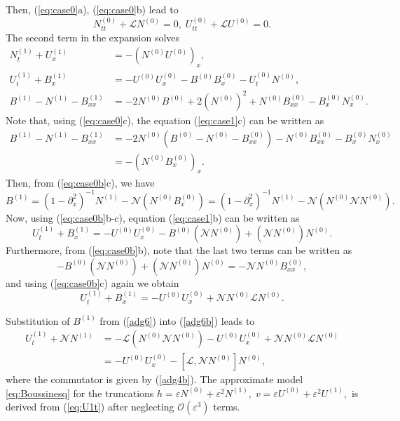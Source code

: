 \documentclass[final,11pt,a4paper,reqno]{amsart}
\theoremstyle{definition}
\begin{document}
Then, (\ref{eq:case0}a), (\ref{eq:case0}b) lead to
\begin{equation}\label{adg5}
N^{(0)}_{tt}+\mathscr{L}N^{(0)}=0,\;
U^{(0)}_{tt}+\mathscr{L}U^{(0)}=0.
\end{equation}
The second term in the expansion solves
\begin{subequations}\label{eq:case1}
\begin{align}
N^{(1)}_t+U^{(1)}_x&=-(N^{(0)}U^{(0)})_x,\\
U^{(1)}_t+B^{(1)}_x&=-U^{(0)}U^{(0)}_x-B^{(0)}B^{(0)}_x-U^{(0)}_tN^{(0)},\\
B^{(1)}-N^{(1)}-B^{(1)}_{xx}&=-2N^{(0)}B^{(0)}+2(N^{(0)})^2+N^{(0)}B_{xx}^{(0)}-B_x^{(0)}N_x^{(0)}.
\end{align}
\end{subequations}
Note that, using (\ref{eq:case0}c), the equation (\ref{eq:case1}c) can be written as
\begin{align*}
B^{(1)}-N^{(1)}-B^{(1)}_{xx}&=-2N^{(0)}(B^{(0)}-N^{(0)}-B_{xx}^{(0)})-N^{(0)}B_{xx}^{(0)}-B_x^{(0)}N_x^{(0)}\\
&=-(N^{(0)}B_{x}^{(0)})_x.
\end{align*}
Then, from (\ref{eq:case0b}c), we have
\begin{equation}\label{adg6}
B^{(1)}=(1-\partial_x^2)^{-1}N^{(1)}-\mathscr{N}(N^{(0)}B_{x}^{(0)})=(1-\partial_x^2)^{-1}N^{(1)}-\mathscr{N}(N^{(0)}\mathscr{N}N^{(0)}).
\end{equation}
Now, using (\ref{eq:case0b}b-c), equation (\ref{eq:case1}b) can be written as
\[
U^{(1)}_t+B^{(1)}_x=-U^{(0)}U^{(0)}_x-B^{(0)}(\mathscr{N}N^{(0)})+(\mathscr{N}N^{(0)})N^{(0)}.
\]
Furthermore, from (\ref{eq:case0b}b), note that the last two terms can be written as
\[-B^{(0)}(\mathscr{N}N^{(0)})+(\mathscr{N}N^{(0)})N^{(0)}=-\mathscr{N}N^{(0)}B^{(0)}_{xx},  \]
and using (\ref{eq:case0b}c) again we obtain
\begin{equation}\label{adg6b}
U^{(1)}_t+B^{(1)}_x=-U^{(0)}U^{(0)}_x+\mathscr{N}N^{(0)}\mathscr{L}N^{(0)}.
\end{equation}

Substitution of $B^{(1)}$ from (\ref{adg6}) into (\ref{adg6b}) leads to
\begin{align}
U^{(1)}_t+\mathscr{N}N^{(1)}&=-\mathscr{L}(N^{(0)}\mathscr{N}N^{(0)})-U^{(0)}U^{(0)}_x+\mathscr{N}N^{(0)}\mathscr{L}N^{(0)}\nonumber \\
&=-U^{(0)}U^{(0)}_x-\left[\mathscr{L},\mathscr{N}N^{(0)}\right]N^{(0)}, \label{eq:U1t}
\end{align}
where the commutator is given by (\ref{adg4b}).  The approximate model \eqref{eq:Boussinesq} for the truncations $h=\varepsilon N^{(0)}+\varepsilon^2 N^{(1)},\;v=\varepsilon U^{(0)}+\varepsilon^2 U^{(1)},$ is derived from (\ref{eq:U1t}) after neglecting $\mathcal{O}(\varepsilon^3)$ terms.
\end{document}
